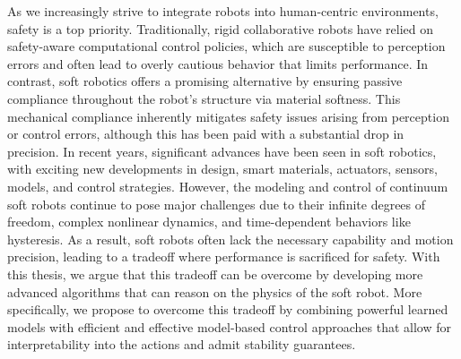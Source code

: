 As we increasingly strive to integrate robots into human-centric environments, safety is a top priority. Traditionally, rigid collaborative robots have relied on safety-aware computational control policies, which are susceptible to perception errors and often lead to overly cautious behavior that limits performance. In contrast, soft robotics offers a promising alternative by ensuring passive compliance throughout the robot’s structure via material softness. This mechanical compliance inherently mitigates safety issues arising from perception or control errors, although this has been paid with a substantial drop in precision. In recent years, significant advances have been seen in soft robotics, with exciting new developments in design, smart materials, actuators, sensors, models, and control strategies. However, the modeling and control of continuum soft robots continue to pose major challenges due to their infinite degrees of freedom, complex nonlinear dynamics, and time-dependent behaviors like hysteresis. As a result, soft robots often lack the necessary capability and motion precision, leading to a tradeoff where performance is sacrificed for safety. With this thesis, we argue that this tradeoff can be overcome by developing more advanced algorithms that can reason on the physics of the soft robot. More specifically, we propose to overcome this tradeoff by combining powerful learned models with efficient and effective model-based control approaches that allow for interpretability into the actions and admit stability guarantees.

